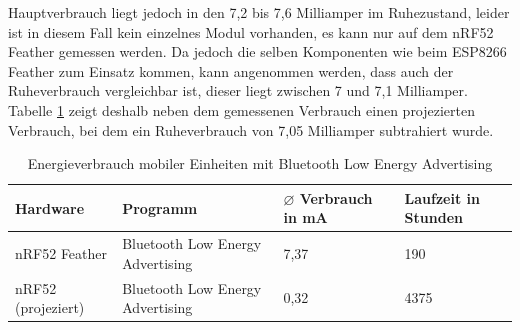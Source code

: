 Hauptverbrauch liegt jedoch in den 7,2 bis 7,6 Milliamper im Ruhezustand, leider ist in diesem Fall kein einzelnes Modul vorhanden, es kann nur auf dem nRF52 Feather gemessen werden.
Da jedoch die selben Komponenten wie beim ESP8266 Feather zum Einsatz kommen, kann angenommen werden, dass auch der Ruheverbrauch vergleichbar ist, dieser liegt zwischen 7 und 7,1 Milliamper.
Tabelle \ref{table:blueina} zeigt deshalb neben dem gemessenen Verbrauch einen projezierten Verbrauch, bei dem ein Ruheverbrauch von 7,05 Milliamper subtrahiert wurde.

\begin{table}[h!]
	\centering
	\caption{Energieverbrauch mobiler Einheiten mit Bluetooth Low Energy Advertising}
	\label{table:blueina}
	\begin{tabular}{p{3.5cm}|p{5cm}|p{2.5cm}|p{2.5cm}}
		Hardware & Programm & $\varnothing$ Verbrauch in mA & Laufzeit in Stunden\\
		\hline
		nRF52 Feather & Bluetooth Low Energy Advertising & 7,37 & 190\\
		nRF52 (projeziert) & Bluetooth Low Energy Advertising & 0,32 & 4375\\
	\end{tabular}
\end{table}






